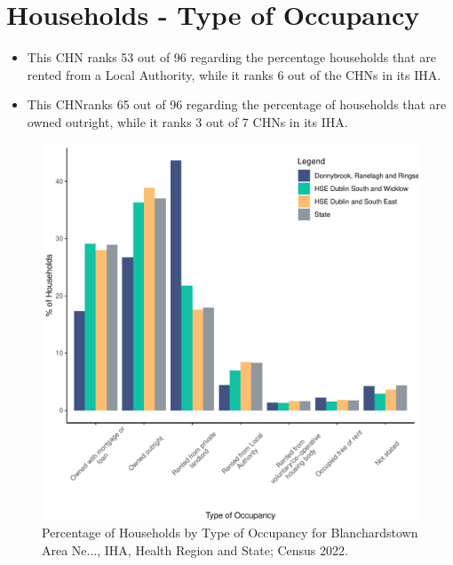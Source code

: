 \documentclass{article}
\begin{document}
\section{Households - Type of Occupancy}\label{sect:Households}
\begin{itemize}
\item This CHN ranks  53 out of 96 regarding the percentage households that are rented from a Local Authority, while it ranks  6 out of the CHNs in its IHA. 
\item This CHNranks  65 out of 96 regarding the percentage of households that are owned outright, while it ranks   3 out of 7 CHNs in its IHA.
\end{itemize}
\begin{figure}[H]
	\centering
	\includegraphics[width = 140mm]{../figures/HouseholdsED.pdf}
	\caption{Percentage of Households by Type of Occupancy for Blanchardstown Area Ne..., IHA, Health Region and State; Census 2022.}
	\label{fig:vbnv}
	\end{figure}
\end{document}
